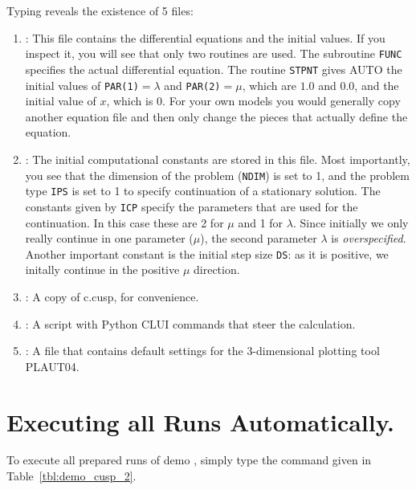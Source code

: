 \documentclass[12pt]{report}
\begin{document}
Typing  reveals the existence of 5 files:
\begin{enumerate}
\item
{}: This file contains the differential equations
and the initial values. If you inspect it, you will see that only two
routines are used. The subroutine {\tt FUNC} specifies the actual
differential equation. The routine {\tt STPNT} gives {\cal AUTO}
the initial values of {\tt PAR(1)}$=\lambda$ and
{\tt PAR(2)}$=\mu$, which
are $1.0$ and $0.0$, and the initial value of $x$, which is $0$.
For your own models you would generally copy another equation file
and then only change the pieces that actually define the equation.

\item
{}: The initial computational constants are stored
in this file. Most importantly, you see that the dimension of the
problem ({\tt NDIM}) is set to 1, and the problem type {\tt IPS}
is set to 1 to specify continuation of a stationary solution.
The constants given by {\tt ICP} specify the parameters that are
used for the continuation. In this case these are 2 for $\mu$ and
1 for $\lambda$.
Since initially we only really continue in one parameter ($\mu$),
the second parameter $\lambda$ is \emph{overspecified}.
Another important constant is the initial step size {\tt DS}: as it is
positive, we initally continue in the positive $\mu$ direction.

\item
{}: A copy of c.cusp, for convenience.

\item
{}: A script with Python CLUI commands that steer
the calculation.

\item
{}: A file that contains default settings for
the 3-dimensional plotting tool {\cal PLAUT04}.

\end{enumerate}

\section{ Executing all Runs Automatically.} \label{sec:Tutorial_all_runs}
To execute all prepared runs of demo ,
simply type the command given in Table~\ref{tbl:demo_cusp_2}.
\end{document}
